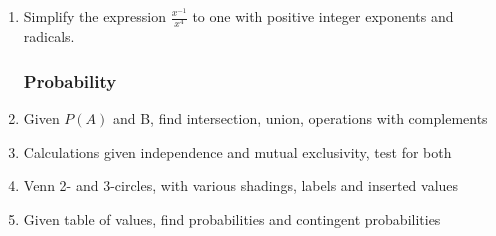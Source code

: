 \documentclass[12pt, oneside]{article}
\begin{document}
\begin{enumerate}
\item Simplify the expression $\displaystyle \frac{x^{-1}}{x^4}$ to one with positive integer exponents and radicals.

\newpage
\subsubsection*{Probability}
\item Given $P(A)$ and B, find intersection, union, operations with complements
\item Calculations given independence and mutual exclusivity, test for both
\item Venn 2- and 3-circles, with various shadings, labels and inserted values
\item Given table of values, find probabilities and contingent probabilities


\end{enumerate}
\end{document}
